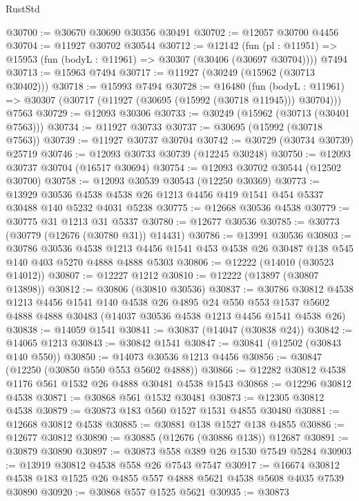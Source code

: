 \begin{lexlean}{RustStd}
\begin{coremodule}
@30700 := @30670 @30690 @30356 @30491
@30702 := @12057 @30700 @4456
@30704 := @11927 @30702 @30544
@30712 := @12142
    (fun (pl : @11951) => @15953 (fun (bodyL : @11961) => @30307 (@30406 (@30697 @30704))))
    @7494
@30713 := @15963 @7494
@30717 := @11927 (@30249 (@15962 (@30713 @30402)))
@30718 := @15993 @7494
@30728 := @16480
    (fun (bodyL : @11961) => @30307 (@30717 (@11927 (@30695 (@15992 (@30718 @11945))) @30704)))
    @7563
@30729 := @12093 @30306
@30733 := @30249 (@15962 (@30713 (@30401 @7563)))
@30734 := @11927 @30733
@30737 := @30695 (@15992 (@30718 @7563))
@30739 := @11927 @30737 @30704
@30742 := @30729 (@30734 @30739) @25719
@30746 := @12093 @30733 @30739 (@12245 @30248)
@30750 := @12093 @30737 @30704 (@16517 @30694)
@30754 := @12093 @30702 @30544 (@12502 @30700)
@30758 := @12093 @30539 @30543 (@12250 @30369)
@30773 := @13929
    @30536
    @4538
    @4538
    @26
    @1213
    @4456
    @419
    @1541
    @454
    @5337
    @30488
    @140
    @5232
    @4031
    @5238
@30775 := @12668 @30536 @4538
@30779 := @30775 @31 @1213 @31 @5337
@30780 := @12677 @30536
@30785 := @30773 (@30779 (@12676 (@30780 @31)) @14431)
@30786 := @13991 @30536
@30803 := @30786
    @30536
    @4538
    @1213
    @4456
    @1541
    @453
    @4538
    @26
    @30487
    @138
    @545
    @140
    @403
    @5270
    @4888
    @4888
    @5303
@30806 := @12222 (@14010 (@30523 @14012))
@30807 := @12227 @1212
@30810 := @12222 (@13897 (@30807 @13898))
@30812 := @30806 (@30810 @30536)
@30837 := @30786
    @30812
    @4538
    @1213
    @4456
    @1541
    @140
    @4538
    @26
    @4895
    @24
    @550
    @553
    @1537
    @5602
    @4888
    @4888
    @30483
    (@14037 @30536 @4538 @1213 @4456 @1541 @4538 @26)
@30838 := @14059 @1541
@30841 := @30837 (@14047 (@30838 @24))
@30842 := @14065 @1213
@30843 := @30842 @1541
@30847 := @30841 (@12502 (@30843 @140 @550))
@30850 := @14073 @30536 @1213 @4456
@30856 := @30847 (@12250 (@30850 @550 @553 @5602 @4888))
@30866 := @12282 @30812 @4538 @1176 @561 @1532 @26 @4888 @30481 @4538 @1543
@30868 := @12296 @30812 @4538
@30871 := @30868 @561 @1532 @30481
@30873 := @12305 @30812 @4538
@30879 := @30873 @183 @560 @1527 @1531 @4855 @30480
@30881 := @12668 @30812 @4538
@30885 := @30881 @138 @1527 @138 @4855
@30886 := @12677 @30812
@30890 := @30885 (@12676 (@30886 @138)) @12687
@30891 := @30879 @30890
@30897 := @30873 @558 @389 @26 @1530 @7549 @5284
@30903 := @13919 @30812 @4538 @558 @26 @7543 @7547
@30917 := @16674 @30812 @4538 @183 @1525 @26 @4855 @557 @4888 @5621 @4538 @5608 @4035 @7539 @30890
@30920 := @30868 @557 @1525 @5621
@30935 := @30873

\end{coremodule}
\end{lexlean}
